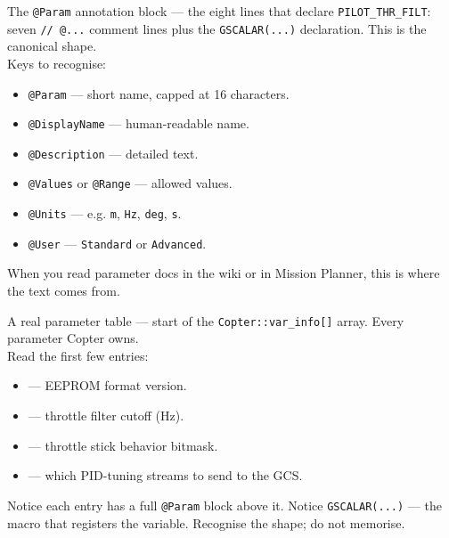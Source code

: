 \documentclass[aspectratio=169,11pt]{beamer}
\begin{document}
\begin{frame}{The \texttt{@Param} annotation block}
   --- the eight lines that declare \texttt{PILOT\_THR\_FILT}: seven \texttt{// @...} comment lines plus the \texttt{GSCALAR(...)} declaration. This is the canonical shape.\\[1ex]
  Keys to recognise:
  \begin{itemize}
    \item \texttt{@Param} --- short name, capped at 16 characters.
    \item \texttt{@DisplayName} --- human-readable name.
    \item \texttt{@Description} --- detailed text.
    \item \texttt{@Values} or \texttt{@Range} --- allowed values.
    \item \texttt{@Units} --- e.g. \texttt{m}, \texttt{Hz}, \texttt{deg}, \texttt{s}.
    \item \texttt{@User} --- \texttt{Standard} or \texttt{Advanced}.
  \end{itemize}
  When you read parameter docs in the wiki or in Mission Planner, this is where the text comes from.
\end{frame}

\begin{frame}{A real parameter table}
   --- start of the \texttt{Copter::var\_info[]} array. Every parameter Copter owns.\\[1ex]
  Read the first few entries:
  \begin{itemize}
    \item {} --- EEPROM format version.
    \item {} --- throttle filter cutoff (Hz).
    \item {} --- throttle stick behavior bitmask.
    \item {} --- which PID-tuning streams to send to the GCS.
  \end{itemize}
  Notice each entry has a full \texttt{@Param} block above it. Notice \texttt{GSCALAR(...)} --- the macro that registers the variable. Recognise the shape; do not memorise.
\end{frame}
\end{document}

